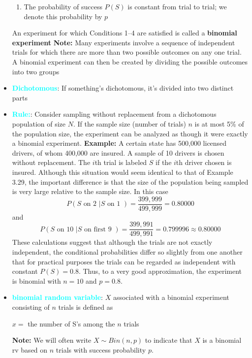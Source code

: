 \documentclass{report}
\begin{document}
\begin{itemize}
\begin{enumerate}
            \item The probability of success $P(S)$ is constant from trial to trial; we denote this probability by $p$
        \end{enumerate}
        \bigbreak \noindent 
        An experiment for which Conditions 1–4 are satisfied is called a \textbf{binomial experiment}
        \bigbreak \noindent 
        \textbf{Note:} Many experiments involve a sequence of independent trials for which there are more than two possible outcomes on any one trial. A binomial experiment can then be created by dividing the possible outcomes into two groups
    \item \textbf{\textcolor{cyan}{Dichotomous}}: If something's dichotomous, it's divided into two distinct parts
    \item \textbf{\textcolor{cyan}{Rule:}}: Consider sampling without replacement from a dichotomous population of
        size $N$. If the sample size (number of trials) $n$ is at most 5\% of the population
        size, the experiment can be analyzed as though it were exactly a binomial
        experiment.
        \bigbreak \noindent 
        \textbf{Example:} A certain state has 500,000 licensed drivers, of whom 400,000 are insured. A sample of 10 drivers is chosen without replacement. The $i$th trial is labeled $S$ if the $i$th driver chosen is insured. Although this situation would seem identical to that of Example 3.29, the important difference is that the size of the population being sampled is very large relative to the sample size. In this case
        \[
            P(S \text{ on 2 } | S \text{ on 1 }) = \frac{399,999}{499,999} = 0.80000
        \]
        and
        \[
            P(S \text{ on 10 } | S \text{ on first 9 }) = \frac{399,991}{499,991} = 0.799996 \approx 0.80000
        \]
        These calculations suggest that although the trials are not exactly independent, the conditional probabilities differ so slightly from one another that for practical purposes the trials can be regarded as independent with constant $P(S) = 0.8$. Thus, to a very good approximation, the experiment is binomial with $n = 10$ and $p = 0.8$.
    \item \textbf{\textcolor{cyan}{binomial random variable}}: $X$ associated with a binomial experiment consisting of $n$ trials is defined as
        \begin{center}
            $x=$ the number of S’s among the $n$ trials
        \end{center}
        \bigbreak \noindent 
        \textbf{Note:} We will often write $X \sim Bin(n,p)$ to indicate that $X$ is a binomial rv based on $n$ trials with success probability $p$.

\end{itemize}
\end{document}
